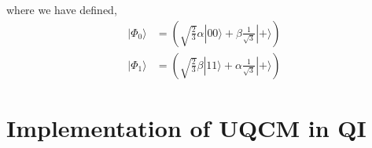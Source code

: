 \documentclass[11p]{article}
\begin{document}
where we have defined,
\begin{align}
|\Phi_0\rangle &=\left( \sqrt{\frac{2}{3}}\alpha|00\rangle +\beta \frac{1}{\sqrt{3}}|+\rangle\right)\\
|\Phi_1\rangle &= \left( \sqrt{\frac{2}{3}}\beta|11\rangle +\alpha \frac{1}{\sqrt{3}}|+\rangle\right)
\end{align}

\section{Implementation of UQCM in QI}
\end{document}
